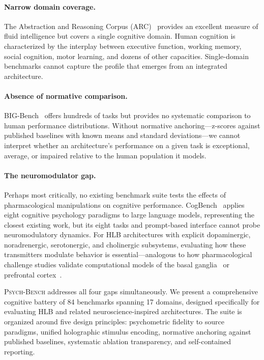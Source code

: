 \documentclass[11pt,letterpaper]{article}
\newcommand{\psychbench}{\textsc{Psych-Bench}}
\newcommand{\hlb}{\textsc{HLB}}
\begin{document}
\paragraph{Narrow domain coverage.} The Abstraction and Reasoning Corpus (ARC)~\citep{chollet2019measure} provides an excellent measure of fluid intelligence but covers a single cognitive domain. Human cognition is characterized by the interplay between executive function, working memory, social cognition, motor learning, and dozens of other capacities. Single-domain benchmarks cannot capture the profile that emerges from an integrated architecture.

\paragraph{Absence of normative comparison.} BIG-Bench~\citep{srivastava2023beyond} offers hundreds of tasks but provides no systematic comparison to human performance distributions. Without normative anchoring---z-scores against published baselines with known means and standard deviations---we cannot interpret whether an architecture's performance on a given task is exceptional, average, or impaired relative to the human population it models.

\paragraph{The neuromodulator gap.} Perhaps most critically, no existing benchmark suite tests the effects of pharmacological manipulations on cognitive performance. CogBench~\citep{codaforno2024cogbench} applies eight cognitive psychology paradigms to large language models, representing the closest existing work, but its eight tasks and prompt-based interface cannot probe neuromodulatory dynamics. For \hlb{} architectures with explicit dopaminergic, noradrenergic, serotonergic, and cholinergic subsystems, evaluating how these transmitters modulate behavior is essential---analogous to how pharmacological challenge studies validate computational models of the basal ganglia~\citep{doya2002metalearning} or prefrontal cortex~\citep{arnsten2011catecholamine}.

\psychbench{} addresses all four gaps simultaneously. We present a comprehensive cognitive battery of 84 benchmarks spanning 17 domains, designed specifically for evaluating \hlb{} and related neuroscience-inspired architectures. The suite is organized around five design principles: psychometric fidelity to source paradigms, unified holographic stimulus encoding, normative anchoring against published baselines, systematic ablation transparency, and self-contained reporting.
\end{document}
